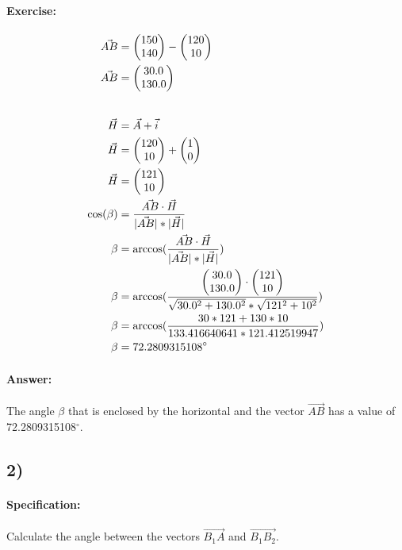 \paragraph{Exercise:} 
\begin{align}
    \vec{AB} &= \vBOne - \vA \\
    \vec{AB} &= \vAB \\[20pt]
    \vec{H} &= \vec{A} + \vec{i} \\
    \vec{H} &= \vA  + \vI \\
    \vec{H} &= \vH \\
    \cos(\beta) &= \frac{\vec{AB} \cdot \vec{H}}{|\vec{AB}| * |\vec{H}|} \\
    \beta &= \arccos(\frac{\vec{AB} \cdot \vec{H}}{|\vec{AB}| * |\vec{H}|}) \\
    \beta &= \arccos(\frac{\vAB \cdot \vH}{\sqrt{\vABX^2 + \vABY^2} * \sqrt{121^2+ 10^2}}) \\
    \beta &= \arccos(\frac{30 * 121 + 130 * 10}{133.416640641 * 121.412519947}) \\
    \beta &= 72.2809315108^\circ
\end{align}

\paragraph{Answer:} 
The angle $\beta$ that is enclosed by the horizontal and the vector $\vec{AB}$ has a value
of 72.2809315108$^\circ$.

\subsection{2)}

\paragraph{Specification:}
Calculate the angle between the vectors $\vec{B_1A}$ and $\vec{B_1B_2}$.

\def\vBOneAX{\pgfmathparse{\pAX - \pBOneX}\pgfmathresult}
\def\vBOneAY{\pgfmathparse{\pAY - \pBOneY}\pgfmathresult}
\def\vBOneA{\begin{pmatrix}
    \vBOneAX \\ 
    \vBOneAY 
\end{pmatrix}}

\def\vBOneBTwoX{\pgfmathparse{\pBTwoX - \pBOneX}\pgfmathresult}
\def\vBOneBTwoY{\pgfmathparse{\pBTwoY - \pBOneY}\pgfmathresult}
\def\vBOneBTwo{\begin{pmatrix}
    \vBOneBTwoX \\ 
    \vBOneBTwoY
\end{pmatrix}}

